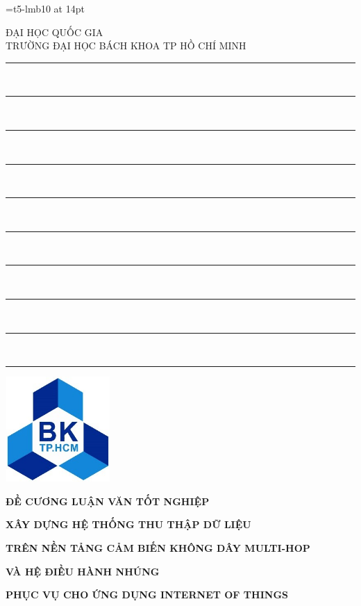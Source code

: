 \font\td=t5-lmb10 at 14pt
\setlength{\fboxsep}{1pt}
\begin{boxedminipage}[t]{15.5cm}
\begin{boxedminipage}[t]{15.4cm}
\begin{titlepage}
\begin{center}
{ ĐẠI HỌC QUỐC GIA}\\
{\td TRƯỜNG ĐẠI HỌC BÁCH KHOA TP HỒ CHÍ MINH}\\
\rule{0.1in}{1pt}\ \rule{0.1in}{1pt}\ \rule{0.1in}{1pt}\ \rule{0.1in}{1pt}\ \rule{0.1in}{1pt}\ \rule{0.1in}{1pt}\ \rule{0.1in}{1pt}\ \rule{0.1in}{1pt}\ \rule{0.1in}{1pt}\ \rule{0.1in}{1pt}
\end{center}

 \vspace{0cm}

\begin{center}
\includegraphics[width=4cm,height=4cm]{logo.jpg}\\
\end{center}

\vspace{0cm}

\begin{center}
 {\bf {ĐỀ CƯƠNG LUẬN VĂN TỐT NGHIỆP}}
\end{center}

\vspace{.4cm}
\begin{center}
\centerline{\bf \td XÂY DỰNG HỆ THỐNG THU THẬP DỮ LIỆU}
\vspace{.1 cm}
\centerline{\bf \td TRÊN NỀN TẢNG CẢM BIẾN KHÔNG DÂY MULTI-HOP}
\vspace{.1 cm}
\centerline{\bf \td VÀ HỆ ĐIỀU HÀNH NHÚNG}
\vspace{.1 cm}
\centerline{\bf \td PHỤC VỤ CHO ỨNG DỤNG INTERNET OF THINGS}
\end{center}


\end{titlepage}
\end{boxedminipage}
\end{boxedminipage}
